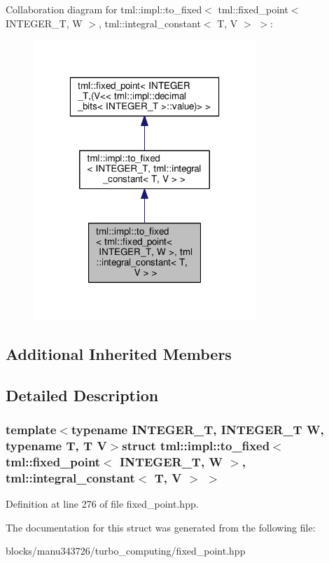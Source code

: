 Collaboration diagram for tml\+:\+:impl\+:\+:to\+\_\+fixed$<$ tml\+:\+:fixed\+\_\+point$<$ I\+N\+T\+E\+G\+E\+R\+\_\+\+T, W $>$, tml\+:\+:integral\+\_\+constant$<$ T, V $>$ $>$\+:
\nopagebreak
\begin{figure}[H]
\begin{center}
\leavevmode
\includegraphics[width=238pt]{structtml_1_1impl_1_1to__fixed_3_01tml_1_1fixed__point_3_01_i_n_t_e_g_e_r___t_00_01_w_01_4_00_01297f5f69578547664f4d94234a889e4b}
\end{center}
\end{figure}
\subsection*{Additional Inherited Members}


\subsection{Detailed Description}
\subsubsection*{template$<$typename I\+N\+T\+E\+G\+E\+R\+\_\+\+T, I\+N\+T\+E\+G\+E\+R\+\_\+\+T W, typename T, T V$>$struct tml\+::impl\+::to\+\_\+fixed$<$ tml\+::fixed\+\_\+point$<$ I\+N\+T\+E\+G\+E\+R\+\_\+\+T, W $>$, tml\+::integral\+\_\+constant$<$ T, V $>$ $>$}



Definition at line 276 of file fixed\+\_\+point.\+hpp.



The documentation for this struct was generated from the following file\+:\begin{DoxyCompactItemize}
\item 
blocks/manu343726/turbo\+\_\+computing/fixed\+\_\+point.\+hpp\end{DoxyCompactItemize}
